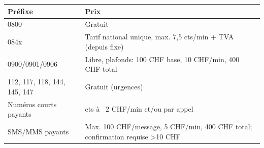\documentclass[a4paper,12pt,answers,addpoints]{exam}
\begin{document}
\begin{questions}
\begin{solution}
\begin{tabularx}{\linewidth}{X>{\raggedright\arraybackslash}X}
	\textbf{Préfixe} & \textbf{Prix} \\ \hline
	0800 & Gratuit \\ 
	084x & Tarif national unique, max. 7,5 cts/min + TVA (depuis fixe) \\ 
	0900/0901/0906 & Libre, plafonds: 100 CHF base, 10 CHF/min, 400 CHF total \\ 
	112, 117, 118, 144, 145, 147 & Gratuit (urgences) \\ 
	Numéros courts payants & 20 cts à ~2 CHF/min et/ou par appel \\ 
	SMS/MMS payants & Max. 100 CHF/message, 5 CHF/min, 400 CHF total; confirmation requise >10 CHF \\
\end{tabularx}



\end{solution}
\end{questions}
\end{document}
